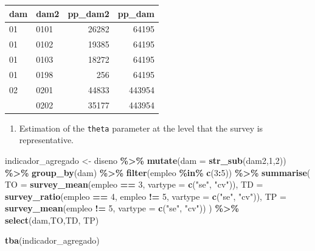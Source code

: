 \documentclass[
  12pt,
]{book}
\newenvironment{Shaded}{\begin{snugshade}}{\end{snugshade}}
\newcommand{\AttributeTok}[1]{\textcolor[rgb]{0.13,0.29,0.53}{#1}}
\newcommand{\DecValTok}[1]{\textcolor[rgb]{0.00,0.00,0.81}{#1}}
\newcommand{\FunctionTok}[1]{\textcolor[rgb]{0.13,0.29,0.53}{\textbf{#1}}}
\newcommand{\NormalTok}[1]{#1}
\newcommand{\OtherTok}[1]{\textcolor[rgb]{0.56,0.35,0.01}{#1}}
\newcommand{\SpecialCharTok}[1]{\textcolor[rgb]{0.81,0.36,0.00}{\textbf{#1}}}
\newcommand{\StringTok}[1]{\textcolor[rgb]{0.31,0.60,0.02}{#1}}
\providecommand{\tightlist}{%
  \setlength{\itemsep}{0pt}\setlength{\parskip}{0pt}}
\begin{document}
\begin{table}[H]
\centering
\centering
\begin{tabular}[t]{llrr}
\toprule
dam & dam2 & pp\_dam2 & pp\_dam\\
\midrule
01 & 0101 & 26282 & 64195\\
01 & 0102 & 19385 & 64195\\
01 & 0103 & 18272 & 64195\\
01 & 0198 & 256 & 64195\\
02 & 0201 & 44833 & 443954\\
\addlinespace
02 & 0202 & 35177 & 443954\\
\bottomrule
\end{tabular}
\end{table}

\begin{enumerate}
\def\labelenumi{\arabic{enumi}.}
\setcounter{enumi}{1}
\tightlist
\item
  Estimation of the \texttt{theta} parameter at the level that the survey is representative.
\end{enumerate}

\begin{Shaded}
\begin{Highlighting}[]
\NormalTok{indicador\_agregado }\OtherTok{\textless{}{-}}
\NormalTok{  diseno }\SpecialCharTok{\%\textgreater{}\%} 
   \FunctionTok{mutate}\NormalTok{(}\AttributeTok{dam =} \FunctionTok{str\_sub}\NormalTok{(dam2,}\DecValTok{1}\NormalTok{,}\DecValTok{2}\NormalTok{)) }\SpecialCharTok{\%\textgreater{}\%} 
  \FunctionTok{group\_by}\NormalTok{(dam) }\SpecialCharTok{\%\textgreater{}\%} 
  \FunctionTok{filter}\NormalTok{(empleo }\SpecialCharTok{\%in\%} \FunctionTok{c}\NormalTok{(}\DecValTok{3}\SpecialCharTok{:}\DecValTok{5}\NormalTok{)) }\SpecialCharTok{\%\textgreater{}\%}
  \FunctionTok{summarise}\NormalTok{(}
    \AttributeTok{TO =} \FunctionTok{survey\_mean}\NormalTok{(empleo }\SpecialCharTok{==} \DecValTok{3}\NormalTok{,}
                     \AttributeTok{vartype =} \FunctionTok{c}\NormalTok{(}\StringTok{"se"}\NormalTok{, }\StringTok{"cv"}\NormalTok{)),}
    \AttributeTok{TD =} \FunctionTok{survey\_ratio}\NormalTok{(empleo }\SpecialCharTok{==} \DecValTok{4}\NormalTok{,}
\NormalTok{                      empleo }\SpecialCharTok{!=} \DecValTok{5}\NormalTok{,}
                      \AttributeTok{vartype =} \FunctionTok{c}\NormalTok{(}\StringTok{"se"}\NormalTok{,  }\StringTok{"cv"}\NormalTok{)),}
    \AttributeTok{TP =} \FunctionTok{survey\_mean}\NormalTok{(empleo }\SpecialCharTok{!=} \DecValTok{5}\NormalTok{,}
                     \AttributeTok{vartype =} \FunctionTok{c}\NormalTok{(}\StringTok{"se"}\NormalTok{,  }\StringTok{"cv"}\NormalTok{))}
\NormalTok{  ) }\SpecialCharTok{\%\textgreater{}\%} \FunctionTok{select}\NormalTok{(dam,TO,TD, TP)}


\FunctionTok{tba}\NormalTok{(indicador\_agregado)}
\end{Highlighting}
\end{Shaded}
\end{document}
